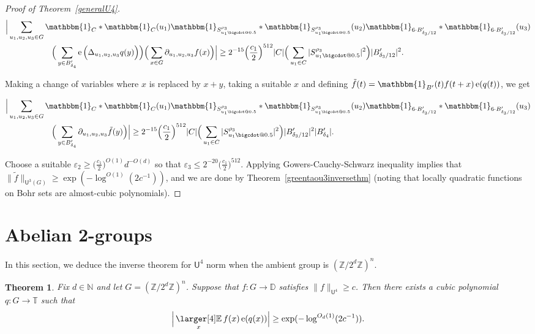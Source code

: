 \documentclass[a4paper,11pt]{article}
\makeatletter
\newtheorem{theorem}{Theorem}
\numberwithin{theorem}{section}
\theoremstyle{definition}
\newcommand\id{\mathbbm{1}}
\newcommand{\on}[1]{
	\operatorname{#1}
}
\newcommand{\exx}{
  \mathop{
    \mathchoice{\vcenter{\hbox{\larger[4]$\mathbb{E}$}}}
               {\kern0pt\mathbb{E}}
               {\kern0pt\mathbb{E}}
               {\kern0pt\mathbb{E}}
  }\displaylimits
}
\newcommand*\bcdot{\mathpalette\bigcdot@{0.5}}
\newcommand*\bigcdot@[2]{\mathbin{\vcenter{\hbox{\scalebox{#2}{$\m@th#1\bullet$}}}}}
\makeatother
\begin{document}
\begin{proof}[Proof of Theorem~\ref{generalU4}]
    \begin{align*}&\Big|\sum_{u_1, u_2, u_3 \in G} \id_{C} \ast \id_{C}(u_1)\id_{S^{\rho_3}_{u_1 \bcdot}} \ast \id_{S^{\rho_3}_{u_1 \bcdot}}(u_2)\id_{6 \cdot B'_{\delta_3/{12}}} \ast \id_{6 \cdot B'_{\delta_3/12}}(u_3)\\
        &\hspace{2cm}\Big(\sum_{y \in B'_{\delta_4}}\on{e}\Big(\Delta_{u_1, u_2, u_3}q(y)\Big)\Big) \Big(\sum_{x \in G} \partial_{u_1, u_2, u_3} f(x)\Big) \Big| \geq 2^{-15}\Big(\frac{c_1}{2}\Big)^{512}  |C| \Big(\sum_{u_1 \in C} |S^{\rho_3}_{u_1 \bcdot}|^2\Big)  |B'_{\delta_3/12}|^2.
        \end{align*}

    Making a change of variables where $x$ is replaced by $x + y$, taking a suitable $x$ and defining $\tilde{f}(t) = \id_{B'}(t) f(t + x) \on{e}(q(t))$, we get

     \begin{align*}&\Big|\sum_{u_1, u_2, u_3 \in G} \id_{C} \ast \id_{C}(u_1)\id_{S^{\rho_3}_{u_1 \bcdot}} \ast \id_{S^{\rho_3}_{u_1 \bcdot}}(u_2)\id_{6 \cdot B'_{\delta_3/{12}}} \ast \id_{6 \cdot B'_{\delta_3/12}}(u_3)\\
        &\hspace{2cm}\Big(\sum_{y \in B'_{\delta_4}} \partial_{u_1, u_2, u_3} \tilde{f}(y)\Big) \Big| \geq 2^{-15}\Big(\frac{c_1}{2}\Big)^{512}  |C| \Big(\sum_{u_1 \in C} |S^{\rho_3}_{u_1 \bcdot}|^2\Big)  |B'_{\delta_3/12}|^2 | B'_{\delta_4}|.
        \end{align*}

    Choose a suitable $\varepsilon_2 \geq \Big(\frac{c_1}{2}\Big)^{O(1)}d^{-O(d)}$ so that $\varepsilon_3 \leq 2^{-20}\Big(\frac{c_1}{2}\Big)^{512}$. Applying Gowers-Cauchy-Schwarz inequality implies that $\|\tilde{f}\|_{\mathsf{U}^3(G)} \geq \exp(-\log^{O(1)}(2c^{-1}))$, and we are done by Theorem~\ref{greentaou3inversethm} (noting that locally quadratic functions on Bohr sets are almost-cubic polynomials). 
\end{proof}


\section{Abelian 2-groups}\label{abelian2groupssection}

In this section, we deduce the inverse theorem for $\mathsf{U}^4$ norm when the ambient group is $(\mathbb{Z}/2^d\mathbb{Z})^n$.

\begin{theorem}\label{abeliantwogroupsinverse}
    Fix $d \in \mathbb{N}$ and let $G = (\mathbb{Z}/2^d\mathbb{Z})^n$. Suppose that $f : G \to \mathbb{D}$ satisfies $\|f\|_{\mathsf{U}^4} \geq c$. Then there exists a cubic polynomial $q : G \to \mathbb{T}$ such that 
    \[\Big|\exx_{x} f(x) \on{e}(q(x))\Big| \geq \exp(-\log^{O_d(1)}(2c^{-1})).\]
\end{theorem}
\end{document}
